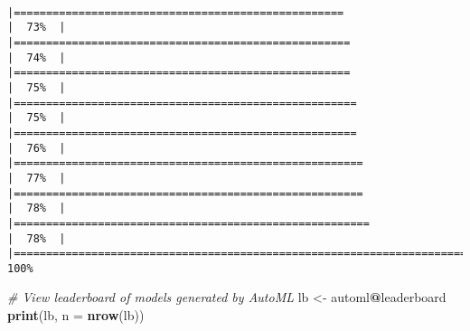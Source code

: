 \documentclass[
]{article}
\newenvironment{Shaded}{\begin{snugshade}}{\end{snugshade}}
\newcommand{\AttributeTok}[1]{\textcolor[rgb]{0.13,0.29,0.53}{#1}}
\newcommand{\CommentTok}[1]{\textcolor[rgb]{0.56,0.35,0.01}{\textit{#1}}}
\newcommand{\FunctionTok}[1]{\textcolor[rgb]{0.13,0.29,0.53}{\textbf{#1}}}
\newcommand{\NormalTok}[1]{#1}
\newcommand{\OtherTok}[1]{\textcolor[rgb]{0.56,0.35,0.01}{#1}}
\newcommand{\SpecialCharTok}[1]{\textcolor[rgb]{0.81,0.36,0.00}{\textbf{#1}}}
\begin{document}
\begin{verbatim}
                                                  |===================================================                   |  73%  |                                                                              |====================================================                  |  74%  |                                                                              |====================================================                  |  75%  |                                                                              |=====================================================                 |  75%  |                                                                              |=====================================================                 |  76%  |                                                                              |======================================================                |  77%  |                                                                              |======================================================                |  78%  |                                                                              |=======================================================               |  78%  |                                                                              |======================================================================| 100%
\end{verbatim}

\begin{Shaded}
\begin{Highlighting}[]
\CommentTok{\# View leaderboard of models generated by AutoML}
\NormalTok{lb }\OtherTok{\textless{}{-}}\NormalTok{ automl}\SpecialCharTok{@}\NormalTok{leaderboard}
\FunctionTok{print}\NormalTok{(lb, }\AttributeTok{n =} \FunctionTok{nrow}\NormalTok{(lb))}
\end{Highlighting}
\end{Shaded}
\end{document}
